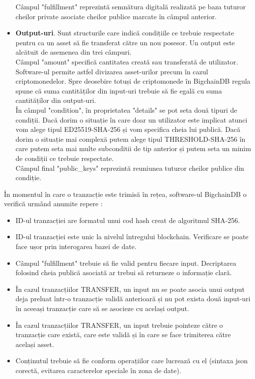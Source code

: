 \begin{itemize}
    Câmpul "fulfillment" reprezintă semnătura digitală realizată pe baza tuturor cheilor private asociate cheilor publice marcate în câmpul anterior.
    
    \item \textbf{Output-uri}.
    Sunt structurile care indică condițiile ce trebuie respectate pentru ca un asset să fie transferat către un nou posesor.
    Un output este alcătuit de asemenea din trei câmpuri.\\
    
    Câmpul "amount" specifică cantitatea creată sau transferată de utilizator. Software-ul permite astfel divizarea asset-urilor precum în cazul criptomonedelor. Spre deosebire totuși de criptomonede în BigchainDB regula spune că suma cantităților din input-uri trebuie să fie egală cu suma cantităților din output-uri.\\
    
    În câmpul "condition", în proprietatea "details" se pot seta două tipuri de condiții. Dacă dorim o situație în care doar un utilizator este implicat atunci vom alege tipul ED25519-SHA-256 și vom specifica cheia lui publică. Dacă dorim o situație mai complexă putem alege tipul THRESHOLD-SHA-256 în care putem seta mai multe subconditii de tip anterior și putem seta un minim de condiții ce trebuie respectate.\\
    
    Câmpul final "public\_keys" reprezintă reuniunea tuturor cheilor publice din condiție.
    
\end{itemize}

În momentul în care o tranzacție este trimisă în rețea, software-ul BigchainDB o verifică urmând anumite repere \cite{BigchainDB_ReadMe}:
\begin{itemize}
    \item ID-ul tranzacției are formatul unui cod hash creat de  algoritmul SHA-256.
    
    \item ID-ul tranzacției este unic la nivelul întregului blockchain. Verificare se poate face ușor prin interogarea bazei de date.
    
    \item Câmpul "fulfillment" trebuie să fie valid pentru fiecare input. Decriptarea folosind cheia publică asociată ar trebui să returneze o informație clară.
    
    \item În cazul tranzacțiilor TRANSFER, un input nu se poate asocia unui output deja preluat într-o tranzacție validă anterioară și nu pot exista două input-uri în aceeași tranzacție care să se asocieze cu același output.
    
    \item În cazul tranzacțiilor TRANSFER, un input trebuie pointeze către o tranzacție care există, care este validă și în care se face trimiterea către același asset.
    
    \item Conținutul trebuie să fie conform operațiilor care lucrează cu el (sintaxa json corectă, evitarea caracterelor speciale în zona de date).
\end{itemize}

